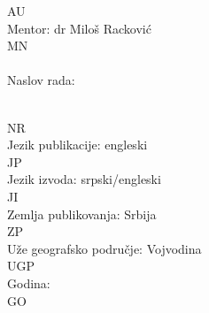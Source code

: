 \begin{tabbing}
  AU                                                               \>                               \\
  Mentor:                                                          \> dr Miloš Racković              \\
  MN                                                               \>                               \\
                                                                   \>                               \\
  Naslov rada:                                                     \> 
    \begin{minipage}[t]{.65\textwidth}
    \naslovsr
  \end{minipage}                                                                                    \\
  NR                                                               \>                               \\
  Jezik publikacije:                                               \> engleski                      \\
  JP                                                               \>                               \\
  Jezik izvoda:                                                    \> srpski/engleski               \\
  JI                                                               \>                               \\
  Zemlja publikovanja:                                             \> Srbija                        \\
  ZP                                                               \>                               \\
  Uže geografsko područje:                                         \> Vojvodina                     \\
  UGP                                                              \>                               \\
  Godina:                                                                                    \\
  GO                                                               \>                               \\
                                                                   \>                               \\

\end{tabbing}
